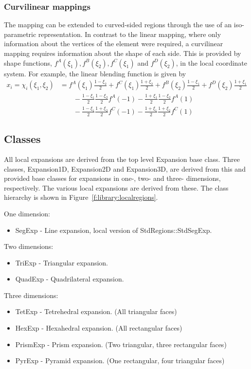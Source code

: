 \subsubsection{Curvilinear mappings}

The mapping can be extended to curved-sided regions through the use of an
iso-parametric representation. In contrast to the linear mapping, where only
information about the vertices of the element were required, a curvilinear
mapping requires information about the shape of each side. This is provided by
shape functions, $f^A(\xi_1), f^B(\xi_2), f^C(\xi_1)$ and
$f^D(\xi_2)$, in the local coordinate system. For example, the linear
blending function is given by
\begin{align*}
  x_i = \chi_i(\xi_1,\xi_2) &= f^A(\xi_1)\frac{1-\xi_2}{2} +
  f^C(\xi_1)\frac{1+\xi_2}{2} + f^B(\xi_2)\frac{1-\xi_1}{2} +
  f^D(\xi_2)\frac{1+\xi_1}{2}\\ &\qquad-
  \frac{1-\xi_1}{2}\frac{1-\xi_2}{2}f^A(-1) - 
  \frac{1+\xi_1}{2}\frac{1-\xi_2}{2}f^A(1)\\ &\qquad-
  \frac{1-\xi_1}{2}\frac{1+\xi_2}{2}f^C(-1) -
  \frac{1+\xi_1}{2}\frac{1+\xi_2}{2}f^C(1)
\end{align*}

\subsection{Classes}
All local expansions are derived from the top level Expansion base class. Three
classes, Expansion1D, Expansion2D and Expansion3D, are derived from this and
provided base classes for expansions in one-, two- and three- dimensions,
respectively. The various local expansions are derived from these. The class
hierarchy is shown in Figure~\ref{f:library:localregions}.

One dimension:
\begin{itemize}
\item SegExp - Line expansion, local version of StdRegions::StdSegExp.
\end{itemize}

Two dimensions:
\begin{itemize}
\item TriExp - Triangular expansion.
\item QuadExp - Quadrilateral expansion.
\end{itemize}

Three dimensions:
\begin{itemize}
\item TetExp - Tetrehedral expansion. (All triangular faces) 
\item HexExp - Hexahedral expansion. (All rectangular faces)
\item PrismExp - Prism expansion. (Two triangular, three rectangular faces)
\item PyrExp - Pyramid expansion. (One rectangular, four triangular faces)
\end{itemize}

